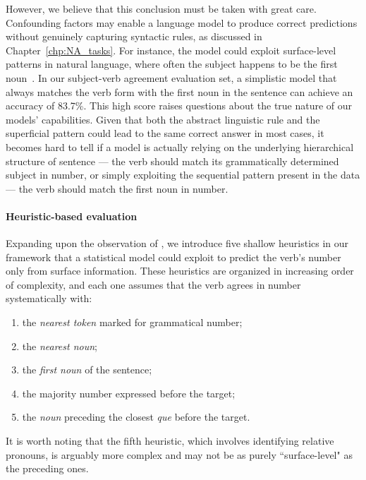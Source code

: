 However, we believe that this conclusion must be taken with great
care. Confounding factors may enable a language model to produce correct predictions without genuinely capturing syntactic rules, as discussed in Chapter~\ref{chp:NA_tasks}. For instance, the model could exploit surface-level patterns in natural language, where often the subject happens to be the first noun~\citep{kuncoro2018perils}.
In our subject-verb agreement evaluation set, a simplistic model that always matches the verb form with the first noun in the sentence can achieve an accuracy of 83.7\%. This high score raises questions about the true nature of our models' capabilities. Given that both the abstract linguistic rule and the superficial pattern could lead to the same correct answer in most cases, it becomes hard to tell if a model is actually relying on the underlying hierarchical structure of sentence --- the verb should match its grammatically determined subject in number, or simply exploiting the sequential pattern present in the data --- the verb should match the first noun in number. 

\paragraph{Heuristic-based evaluation}
Expanding upon the observation of \cite{kuncoro2018perils}, we
introduce five shallow heuristics in our framework that a statistical model could exploit to predict the verb's number only from surface
information. These heuristics are organized in increasing order of complexity, and each one assumes that the \target verb agrees in number systematically with:
\begin{enumerate}[label=h\arabic*.]
\item the \emph{nearest token} marked for grammatical number;
\item the \emph{nearest noun};
\item the \emph{first noun} of the sentence;
\item the majority number expressed before the target;
\item the \emph{noun} preceding the closest \emph{que} before the target.
\end{enumerate} 
It is worth noting that the fifth heuristic, which involves identifying relative pronouns, is arguably more complex and may not be as purely ``surface-level" as the preceding ones.

